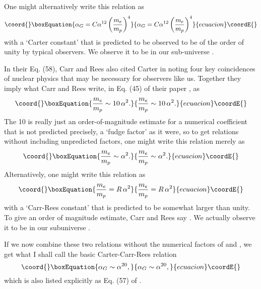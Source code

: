 \documentclass[a4paper,12pt]{article}
\begin{document}
 	One might alternatively write this relation as
 \begin{equation}\coord{}\boxEquation{
 \alpha_G = C\alpha^{12}\left({m_e\over m_p}\right)^4
 \label{eq:3}
 }{
 \alpha_G = C\alpha^{12}\left({m_e\over m_p}\right)^4
 }{ecuacion}\coordE{}\end{equation}
with a `Carter constant' \coordHE{} that is predicted to be
observed to be of the order of unity by typical observers.
We observe it to be \coordHE{} in our sub-universe \cite{PDG}.
 
	In their Eq. (58), Carr and Rees \cite{Carr-Rees}
also cited Carter \cite{Carter2} in noting
four key coincidences of nuclear physics that may be
necessary for observers like us.  Together they imply
what Carr and Rees write, in Eq. (45) of their paper \cite{Carr-Rees},
as
 \begin{equation}\coord{}\boxEquation{
 {m_e \over m_p} \sim 10 \, \alpha^2.
 \label{eq:4}
 }{
 {m_e \over m_p} \sim 10 \, \alpha^2.
 }{ecuacion}\coordE{}\end{equation}
The 10 is really just an order-of-magnitude estimate
for a numerical coefficient that is not predicted precisely,
a `fudge factor' as it were, so to get relations
without including unpredicted factors, one might write this
relation merely as
 \begin{equation}\coord{}\boxEquation{
 {m_e \over m_p} \sim \alpha^2.
 \label{eq:5}
 }{
 {m_e \over m_p} \sim \alpha^2.
 }{ecuacion}\coordE{}\end{equation}
Alternatively, one might write this relation as
 \begin{equation}\coord{}\boxEquation{
 {m_e \over m_p} = R \, \alpha^2
 \label{eq:6}
 }{
 {m_e \over m_p} = R \, \alpha^2
 }{ecuacion}\coordE{}\end{equation}
with a `Carr-Rees constant' \coordHE{} that is predicted
to be somewhat larger than unity.
To give an order of magnitude estimate, Carr and Rees say \coordHE{}.
We actually observe it to be \coordHE{} in our subuniverse
\cite{PDG}.

	If we now combine these two relations
without the numerical factors of \coordHE{} and \coordHE{}, we get
what I shall call the basic Carter-Carr-Rees relation
 \begin{equation}\coord{}\boxEquation{
 \alpha_G \sim \alpha^{20},
 \label{eq:7}
 }{
 \alpha_G \sim \alpha^{20},
 }{ecuacion}\coordE{}\end{equation}
which is also listed explicitly as Eq. (57) of \cite{Carr-Rees}.
\end{document}
